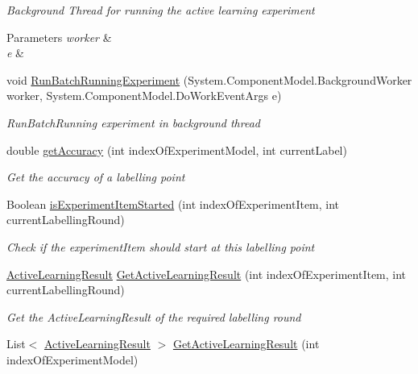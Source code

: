 \begin{DoxyCompactItemize}
\begin{DoxyCompactList}\small\item\em Background Thread for running the active learning experiment 
\begin{DoxyParams}{Parameters}
{\em worker} & \\
\hline
{\em e} & \\
\hline
\end{DoxyParams}
\end{DoxyCompactList}\item 
void \hyperlink{class_acrive_crowd_g_u_i_1_1_experiment_setting_abc8c2a3b0951e9cf7f28d46b07f2a422}{Run\+Batch\+Running\+Experiment} (System.\+Component\+Model.\+Background\+Worker worker, System.\+Component\+Model.\+Do\+Work\+Event\+Args e)
\begin{DoxyCompactList}\small\item\em Run\+Batch\+Running experiment in background thread \end{DoxyCompactList}\item 
double \hyperlink{class_acrive_crowd_g_u_i_1_1_experiment_setting_ab3ddb0f84b138a56652ab9f231628a78}{get\+Accuracy} (int index\+Of\+Experiment\+Model, int current\+Label)
\begin{DoxyCompactList}\small\item\em Get the accuracy of a labelling point \end{DoxyCompactList}\item 
Boolean \hyperlink{class_acrive_crowd_g_u_i_1_1_experiment_setting_aba216fa7ab6f83f783f51ae1ba93e80f}{is\+Experiment\+Item\+Started} (int index\+Of\+Experiment\+Item, int current\+Labelling\+Round)
\begin{DoxyCompactList}\small\item\em Check if the experiment\+Item should start at this labelling point \end{DoxyCompactList}\item 
\hyperlink{class_crowdsourcing_models_1_1_active_learning_result}{Active\+Learning\+Result} \hyperlink{class_acrive_crowd_g_u_i_1_1_experiment_setting_ad78cdd780a21131e6f3ba3bba6402243}{Get\+Active\+Learning\+Result} (int index\+Of\+Experiment\+Item, int current\+Labelling\+Round)
\begin{DoxyCompactList}\small\item\em Get the Active\+Learning\+Result of the required labelling round \end{DoxyCompactList}\item 
List$<$ \hyperlink{class_crowdsourcing_models_1_1_active_learning_result}{Active\+Learning\+Result} $>$ \hyperlink{class_acrive_crowd_g_u_i_1_1_experiment_setting_a7cfb79f62cecb995582932ff1d33e094}{Get\+Active\+Learning\+Result} (int index\+Of\+Experiment\+Model)

\end{DoxyCompactItemize}
